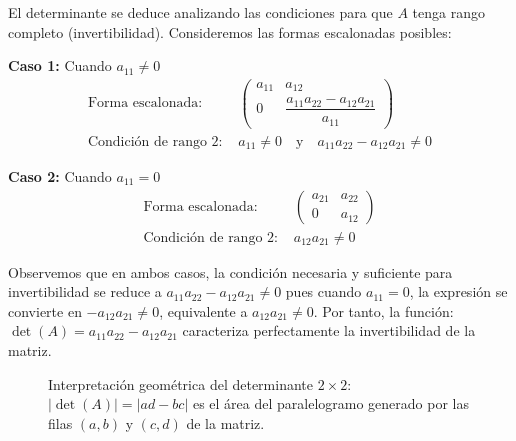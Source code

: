 \begin{rem}[Fundamentación]
El determinante se deduce analizando las condiciones para que \(A\) tenga rango completo (invertibilidad). Consideremos las formas escalonadas posibles:

\noindent
\textbf{Caso 1:} Cuando \(a_{11} \neq 0\)
\begin{align*}
\text{Forma escalonada: } &
\begin{pmatrix}
a_{11} & a_{12} \\
0 & \dfrac{a_{11}a_{22} - a_{12}a_{21}}{a_{11}}
\end{pmatrix} \\
\text{Condición de rango 2: } & a_{11} \neq 0 \quad \text{y} \quad a_{11}a_{22} - a_{12}a_{21} \neq 0
\end{align*}

\noindent
\textbf{Caso 2:} Cuando \(a_{11} = 0\)
\begin{align*}
\text{Forma escalonada: } & 
\begin{pmatrix}
a_{21} & a_{22} \\
0 & a_{12}
\end{pmatrix} \\
\text{Condición de rango 2: } & a_{12}a_{21} \neq 0
\end{align*}

\noindent
Observemos que en ambos casos, la condición necesaria y suficiente para invertibilidad se reduce a \(
a_{11}a_{22} - a_{12}a_{21} \neq 0
\) pues cuando \(a_{11} = 0\), la expresión se convierte en \(-a_{12}a_{21} \neq 0\), equivalente a \(a_{12}a_{21} \neq 0\). Por tanto, la función:
\(\det(A) = a_{11}a_{22} - a_{12}a_{21}
\) caracteriza perfectamente la invertibilidad de la matriz.
\end{rem}

\begin{figure}[!htbp]
\centering
{}
\caption{Interpretación geométrica del determinante $2\times 2$: $|\det(A)|=|ad-bc|$ es el área del paralelogramo generado por las filas $(a,b)$ y $(c,d)$ de la matriz.}
\label{fig:det_area}
\end{figure}

